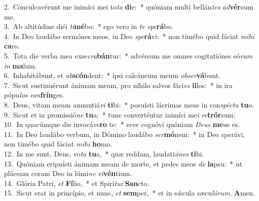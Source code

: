 {2.~}Conculcavérunt me inimíci mei to\textit{ta} \textbf{di}e:~* quóniam multi bellán\textit{tes} \textit{ad}\textbf{vér}sum me.\\
{3.~}Ab altitúdine diéi \textit{ti}\textbf{mé}bo:~* ego vero in \textit{te} \textit{spe}\textbf{rá}bo.\\
{4.~}In Deo laudábo sermónes meos, in Deo \textit{spe}\textbf{rá}vi:~* non timébo quid fáciat \textit{mi}\textit{hi} \textbf{ca}ro.\\
{5.~}Tota die verba mea exse\textit{cra}\textbf{bán}tur:~* advérsum me omnes cogitatiónes eó\textit{rum} \textit{in} \textbf{ma}lum.\\
{6.~}Inhabitábunt, et \textit{ab}\textbf{scón}dent:~* ipsi calcáneum meum \textit{ob}\textit{ser}\textbf{vá}bunt.\\
{7.~}Sicut sustinuérunt ánimam meam, pro níhilo salvos fáci\textit{es} \textbf{il}los:~* in ira pópu\textit{los} \textit{con}\textbf{frín}ges.\\
{8.~}Deus, vitam meam annuntiá\textit{vi} \textbf{ti}bi:~* posuísti lácrimas meas in con\textit{spé}\textit{ctu} \textbf{tu}o.\\
{9.~}Sicut et in promissió\textit{ne} \textbf{tu}a:~* tunc converténtur inimíci me\textit{i} \textit{re}\textbf{trór}sum:\\
{10.~}In quacúmque die invocá\textit{ve}\textbf{ro} te:~* ecce cognóvi quóniam \textit{De}\textit{us} \textbf{me}us es.\\
{11.~}In Deo laudábo verbum, in Dómino laudábo \textit{ser}\textbf{mó}nem:~* in Deo sperávi, non timébo quid fáciat \textit{mi}\textit{hi} \textbf{ho}mo.\\
{12.~}In me sunt, Deus, vo\textit{ta} \textbf{tu}a,~* quæ reddam, laudati\textit{ó}\textit{nes} \textbf{ti}bi.\\
{13.~}Quóniam eripuísti ánimam meam de morte, et pedes meos \textit{de} \textbf{la}psu:~* ut pláceam coram Deo in lúmi\textit{ne} \textit{vi}\textbf{vén}tium.\\
{14.~}Glória Patri, \textit{et} \textbf{Fí}lio,~* et Spirí\textit{tu}\textit{i} \textbf{San}cto.\\
{15.~}Sicut erat in princípio, et nunc, \textit{et} \textbf{sem}per,~* et in sǽcula sæcu\textit{ló}\textit{rum}. \textbf{A}men.\\
